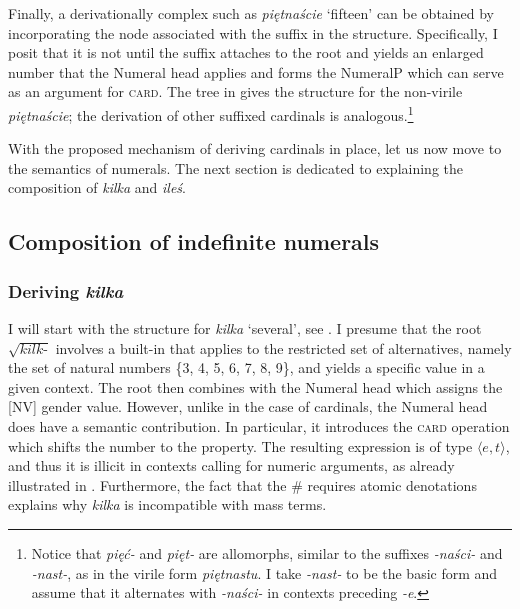 \documentclass[output=paper, newtxmath, colorlinks, citecolor=brown]{langsci/langscibook}
\begin{document}
\largerpage[2]
Finally, a derivationally complex  such as \textit{piętnaście} `fifteen' can be obtained by incorporating the node associated with the  suffix in the structure. Specifically, I posit that it is not until the  suffix attaches to the root and yields an enlarged number that the Numeral head applies and forms the NumeralP which can serve as an argument for \textsc{card}. The tree in  gives the structure for the non-virile  \textit{piętnaście}; the derivation of other suffixed cardinals is analogous.\footnote{Notice that \textit{pięć-} and \textit{pięt-} are allomorphs, similar to the suffixes \textit{-naści-} and \textit{-nast-}, as in the virile form \textit{piętnastu}. I take \textit{-nast-} to be the basic form and assume that it alternates with \textit{-naści-} in contexts preceding \textit{-e}.}
\clearpage



With the proposed mechanism of deriving  cardinals in place, let us now move to the semantics of  numerals. The next section is dedicated to explaining the composition of \textit{kilka} and \textit{ileś}.

	\subsection{Composition of indefinite numerals}\label{sec:composition-of-indefinite-numerals}

\subsubsection{Deriving \textit{kilka}}\label{sec:deriving-kilka}

\noindent I will start with the structure for \textit{kilka} `several', see . I presume that the root $\sqrt{\textit{kilk-}}$ involves a built-in  that applies to the restricted set of alternatives, namely the set of natural numbers \{3, 4, 5, 6, 7, 8, 9\}, and yields a specific value in a given context. The root then combines with the Numeral head which assigns the [NV] gender value. However, unlike in the case of cardinals, the Numeral head does have a semantic contribution. In particular, it introduces the \textsc{card} operation which shifts the  number to the  property. The resulting expression is of type $\langle e,t\rangle$, and thus it is illicit in contexts calling for numeric arguments, as already illustrated in . Furthermore, the fact that the  \# requires atomic denotations explains why \textit{kilka} is incompatible with mass terms.
\end{document}
